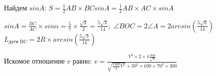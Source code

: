Найдем $sinA$:  $S=\frac{1}{2} AB \times BC sinA=\frac{1}{2} AB \times AC \times sinA$

$sinA=\frac{BC}{AC} \times sin\alpha =\frac{5}{7} \times \frac{\sqrt{3}}{2}=\frac{5\sqrt{3}}{14};$      $\angle BOC=2\angle A=2arcsin\left(\frac{5\sqrt{3}}{14}\right)$
$L_{\text{дуги BC}}=2R \times arcsin\left(\frac{5\sqrt{3}}{14}\right) $

Искомое  отношение $v$ равно:     
$v=\frac{V^2 \times 2 \times \pi \frac{700}{\sqrt{3}}}{\sqrt{\frac{1400}{3} V^2}+30^2 \times 100+70^2 \times 300}$


